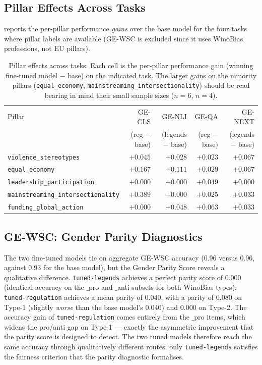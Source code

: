 \documentclass[pdflatex, sn-apa]{sn-jnl}%
\theoremstyle{thmstyleone}%
\theoremstyle{thmstyletwo}%
\theoremstyle{thmstylethree}%
\newcommand{\modellegends}{\texttt{tuned-legends}}
\newcommand{\modelreg}{\texttt{tuned-regulation}}
\begin{document}
\subsection{Pillar Effects Across Tasks}
\label{sec:results:pillars}

 reports the per-pillar performance \emph{gains} over the base
model for the four tasks where pillar labels are available (GE-WSC is excluded
since it uses WinoBias professions, not EU pillars).

\begin{table}[h]
\centering
\caption{Pillar effects across tasks. Each cell is the per-pillar performance
gain (winning fine-tuned model $-$ base) on the indicated task. The larger gains
on the minority pillars (\texttt{equal\_economy},
\texttt{mainstreaming\_intersectionality}) should be read bearing in mind their
small sample sizes ($n=6$, $n=4$).}
\label{tab:pillars}
\small
\begin{tabular}{@{}lrrrr@{}}
\toprule
Pillar                                & GE-CLS        & GE-NLI        & GE-QA
& GE-NEXT       \\
                                      & (reg $-$ base)& (legends $-$ base) &
                                      (reg $-$ base) & (legends $-$ base) \\
\midrule
\texttt{violence\_stereotypes}        & $+0.045$      & $+0.028$      & $+0.023$
& $+0.067$      \\
\texttt{equal\_economy}               & $+0.167$      & $+0.111$      & $+0.029$
& $+0.067$      \\
\texttt{leadership\_participation}    & $+0.000$      & $+0.000$      & $+0.049$
& $+0.000$      \\
\texttt{mainstreaming\_intersectionality} & $+0.389$  & $+0.000$      & $+0.025$
& $+0.033$      \\
\texttt{funding\_global\_action}      & $+0.000$      & $+0.048$      & $+0.063$
& $+0.033$      \\
\bottomrule
\end{tabular}
\end{table}


\subsection{GE-WSC: Gender Parity Diagnostics}
\label{sec:results:wsc}

The two fine-tuned models tie on aggregate GE-WSC accuracy (0.96 versus 0.96,
against 0.93 for the base model), but the Gender Parity Score reveals a
qualitative difference. \modellegends{} achieves a perfect parity score of 0.000
(identical accuracy on the $\_$pro and $\_$anti subsets for both WinoBias types);
\modelreg{} achieves a mean parity of 0.040, with a parity of 0.080 on Type-1
(slightly \emph{worse} than the base model's 0.040) and 0.000 on Type-2. The
accuracy gain of \modelreg{} comes entirely from the $\_$pro items, which widens
the pro/anti gap on Type-1 --- exactly the asymmetric improvement that the parity
score is designed to detect. The two tuned models therefore reach the same
accuracy through qualitatively different routes; only \modellegends{} satisfies
the fairness criterion that the parity diagnostic formalises.
\end{document}

